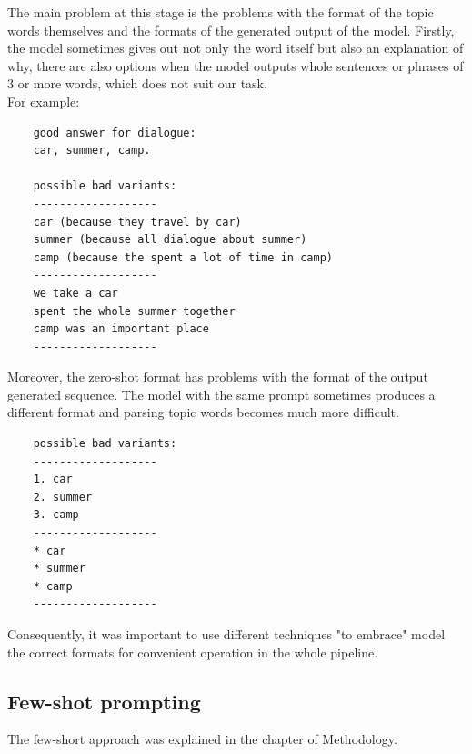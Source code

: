 \documentclass[PMI,VKR]{HSEUniversity}
\begin{document}
The main problem at this stage is the problems with the format of the topic words themselves and the formats of the generated output of the model. 
Firstly, the model sometimes gives out not only the word itself but also an explanation of why, there are also options when the model outputs whole sentences or phrases of 3 or more words, which does not suit our task. \\
For example:

\begin{lstlisting}
    good answer for dialogue: 
    car, summer, camp.   
    
    possible bad variants:
    -------------------
    car (because they travel by car)
    summer (because all dialogue about summer)
    camp (because the spent a lot of time in camp)
    -------------------
    we take a car
    spent the whole summer together
    camp was an important place
    -------------------
\end{lstlisting}


Moreover, the zero-shot format has problems with the format of the output generated sequence. 
The model with the same prompt sometimes produces a different format and parsing topic words becomes much more difficult.

\begin{lstlisting}
    possible bad variants:
    -------------------    
    1. car
    2. summer
    3. camp
    -------------------
    * car
    * summer
    * camp
    -------------------
\end{lstlisting}

Consequently, it was important to use different techniques "to embrace" model the correct formats for convenient operation in the whole pipeline.

\subsection{Few-shot prompting}

The few-short approach was explained in the chapter of Methodology.
\end{document}
